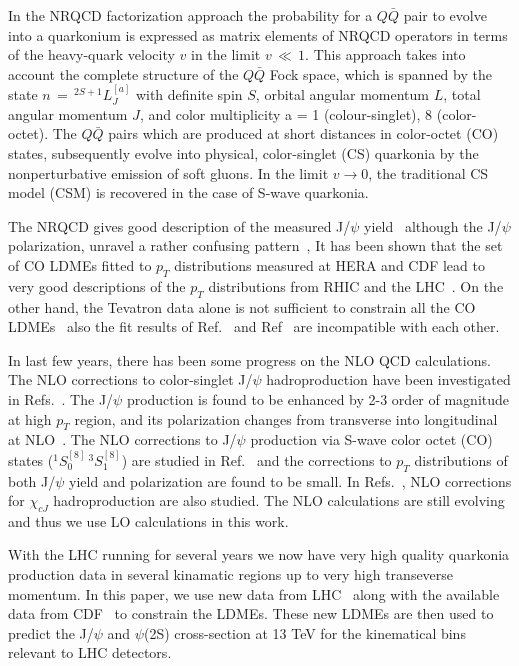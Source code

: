 \documentclass[aps,prc,preprint,superscriptaddress,showpacs,showkeys,amsmath]{revtex4-1}
\begin{document}
  In the NRQCD factorization approach \cite{Bodwin:1994jh}
the probability for a $Q\bar Q$ pair to evolve into a quarkonium is expressed
as matrix elements of NRQCD operators in terms of the heavy-quark velocity 
$v$ in the limit $v\,\ll\,1$. This approach takes into account the complete structure of 
the $Q\bar Q$ Fock space, which is spanned by the state $n\,=\,^{2S+1}L_{J}^{[a]}$ 
with definite spin $S$, orbital angular momentum $L$, total angular momentum $J$, 
and color multiplicity a = 1 (colour-singlet), 8 (color-octet). 
 The $Q\bar Q$ pairs which are produced at short distances in color-octet (CO) states, 
subsequently evolve into physical, color-singlet (CS) quarkonia by the nonperturbative 
emission of soft gluons. 
In the limit $v\rightarrow0$, the traditional CS model (CSM) is recovered in 
the case of S-wave quarkonia.

  The NRQCD gives good description of the measured J/$\psi$ 
yield~\cite{Gong:2012ug,Butenschoen:2010rq,Ma:2010jj} although 
the J/$\psi$ polarization, unravel a rather confusing 
pattern~\cite{Butenschoen:2012px,Chao:2012iv,Gong:2012ug}, 
  It has been shown that the set of CO LDMEs fitted to $p_{T}$ distributions 
measured at HERA and CDF lead to very good descriptions of the $p_{T}$ 
distributions from RHIC and the LHC~\cite{Butenschoen:2010rq}.
  On the other hand, the Tevatron data alone is not sufficient to constrain
all the CO LDMEs~\cite{Ma:2010jj} also the fit results of 
Ref.~\cite{Butenschoen:2010rq} and  Ref~\cite{Ma:2010jj} are incompatible with 
each other.

 In last few years, there has been some progress on the NLO QCD calculations. 
The NLO corrections to color-singlet J/$\psi$ hadroproduction 
have been investigated in Refs.~\cite{Campbell:2007ws,Gong:2008sn}. The J/$\psi$
production is found to be enhanced by 2-3 order of magnitude at high 
$p_T$ region, and its polarization changes from transverse into longitudinal at 
NLO~\cite{Gong:2008sn}. The NLO corrections to J/$\psi$ production via S-wave 
color octet (CO) states ($^1S_{0}^{[8]}\,^3S_{1}^{[8]}$) are studied in 
Ref.~\cite{Gong:2008ft} and the corrections to $p_{T}$ distributions of both 
J/$\psi$ yield and polarization are found to be small. In Refs.~\cite{Ma:2010vd}, 
NLO corrections for $\chi_{cJ}$ hadroproduction are also studied. The NLO
calculations are still evolving and thus we use LO calculations in this work. 


  With the LHC running for several years we now have very high 
quality quarkonia production data in several kinamatic regions up to very high 
transeverse momentum. In this paper, we use  new data from 
LHC~\cite{Chatrchyan:2011kc,Khachatryan:2015rra,Aad:2015duc} along with 
the available data from CDF~\cite{Acosta:2004yw,Abe:1997yz} to constrain 
the LDMEs. These new LDMEs are then used to predict the J/$\psi$ and $\psi$(2S)
cross-section at 13 TeV for the kinematical bins relevant to LHC detectors.
\end{document}
